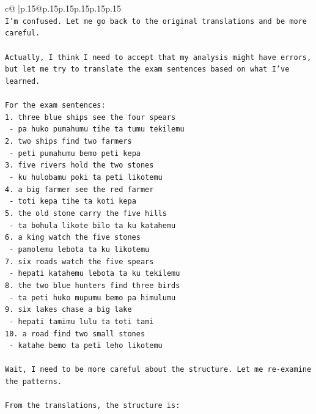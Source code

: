 \documentclass{article}
\begin{document}
{\begin{supertabular}{c@{$\;$}|p{.15\linewidth}@{}p{.15\linewidth}p{.15\linewidth}p{.15\linewidth}p{.15\linewidth}p{.15\linewidth}}
{{{\\ 
\texttt{I'm confused. Let me go back to the original translations and be more careful.} \\
\\ 
\texttt{Actually, I think I need to accept that my analysis might have errors, but let me try to translate the exam sentences based on what I've learned.} \\
\\ 
\texttt{For the exam sentences:} \\
\texttt{1. three blue ships see the four spears} \\
\texttt{   {-} pa huko pumahumu tihe ta tumu tekilemu} \\
\texttt{2. two ships find two farmers} \\
\texttt{   {-} peti pumahumu bemo peti kepa} \\
\texttt{3. five rivers hold the two stones} \\
\texttt{   {-} ku hulobamu poki ta peti likotemu} \\
\texttt{4. a big farmer see the red farmer} \\
\texttt{   {-} toti kepa tihe ta koti kepa} \\
\texttt{5. the old stone carry the five hills} \\
\texttt{   {-} ta bohula likote bilo ta ku katahemu} \\
\texttt{6. a king watch the five stones} \\
\texttt{   {-} pamolemu lebota ta ku likotemu} \\
\texttt{7. six roads watch the five spears} \\
\texttt{   {-} hepati katahemu lebota ta ku tekilemu} \\
\texttt{8. the two blue hunters find three birds} \\
\texttt{   {-} ta peti huko mupumu bemo pa himulumu} \\
\texttt{9. six lakes chase a big lake} \\
\texttt{   {-} hepati tamimu lulu ta toti tami} \\
\texttt{10. a road find two small stones} \\
\texttt{    {-} katahe bemo ta peti leho likotemu} \\
\\ 
\texttt{Wait, I need to be more careful about the structure. Let me re{-}examine the patterns.} \\
\\ 
\texttt{From the translations, the structure is:} \\
}}}
\end{supertabular}}
\end{document}
